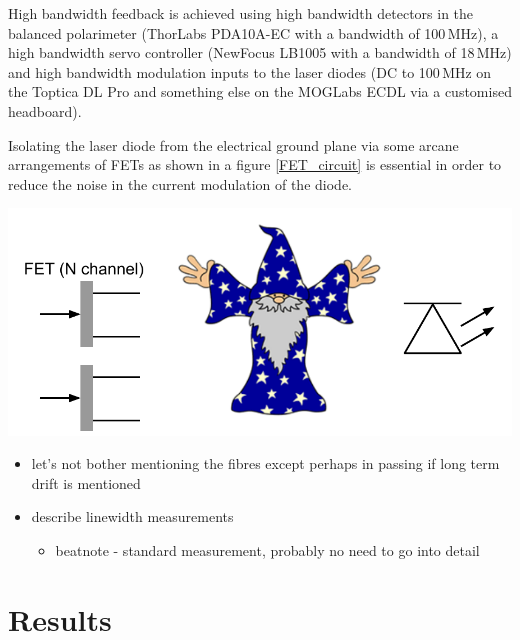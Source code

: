 \documentclass{article}
\newenvironment{Figure}
  {\par\medskip\noindent\minipage{\linewidth}}
  {\endminipage\par\medskip}
\begin{document}
\begin{multicols}{2}
High bandwidth feedback is achieved using high bandwidth detectors in the balanced polarimeter (ThorLabs PDA10A-EC with a bandwidth of 100\,MHz), a high bandwidth servo controller (NewFocus LB1005 with a bandwidth of 18\,MHz) and high bandwidth modulation inputs to the laser diodes (DC to 100\,MHz on the Toptica DL Pro and {\color{red} something else} on the MOGLabs ECDL via a customised headboard).

Isolating the laser diode from the electrical ground plane {\color{red} via some arcane arrangements of FETs as shown in a figure \ref{FET_circuit}} is essential in order to reduce the noise in the current modulation of the diode.

\begin{Figure}
    \centering
    \captionsetup{type=figure}
    \includegraphics[width=\linewidth]{Figs/LaserDiodeAndFETs.pdf}
    \label{FET_circuit}
\end{Figure}

\begin{itemize}
\item let's not bother mentioning the fibres except perhaps in passing if long term drift is mentioned
\end{itemize}


\begin{itemize}
\item describe linewidth measurements
    \begin{itemize}
    \item beatnote - standard measurement, probably no need to go into detail
    \end{itemize}
\end{itemize}


\section{Results}

\end{multicols}
\end{document}
